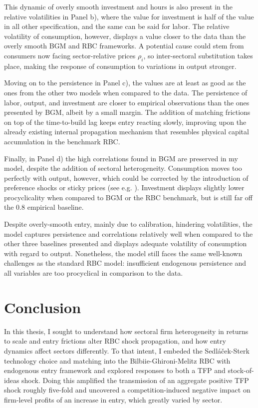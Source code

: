 \documentclass[a4paper,12pt]{article} %
\numberwithin{equation}{section} %
\numberwithin{figure}{section}
\numberwithin{table}{section}
\begin{document}
This dynamic of overly smooth investment and hours is also present in the relative volatilities in Panel b), where the value 
for investment is half of the value in all other specification, and the same can be said for labor. The relative volatility of
consumption, however, displays a value closer to the data than the overly smooth BGM and RBC frameworks. A potential cause could 
stem from consumers now facing sector-relative prices $\rho_i$, so inter-sectoral substitution takes place, making the 
response of consumption to variations in output stronger.

Moving on to the persistence in Panel c), the values are at least as good as the ones from the other two models 
when compared to the data. The persistence of labor, output, and investment are closer to 
empirical observations than the ones presented by BGM, albeit by a small margin. The addition of matching frictions on top of the 
time-to-build lag keeps entry reacting slowly, improving upon the already existing internal propagation mechanism 
that resembles physical capital accumulation in the benchmark RBC.

Finally, in Panel d) the high correlations found in BGM are preserved in my model, despite the addition of sectoral heterogeneity.
Consumption moves too perfectly with output, however, which could be corrected by the introduction of preference shocks or sticky
prices (see e.g. \cite{smets2007shocks}). Investment displays slightly lower procyclicality when compared to BGM or the RBC benchmark, but is still far off the $0.8$ 
empirical baseline. 

Despite overly-smooth entry, mainly due to calibration, hindering volatilities, the model captures persistence and 
correlations relatively well when compared to the other three baselines presented and displays adequate volatility of consumption
with regard to output. Nonetheless, the model still faces the same well-known challenges as the standard RBC model: 
insufficient endogenous persistence and all variables are too procyclical in  comparison to the data.


\section{Conclusion}
\label{sec:conclusion}

In this thesis, I sought to understand how sectoral firm heterogeneity in returns to scale and entry frictions alter RBC shock propagation, and how
entry dynamics affect sectors differently.
To that intent, I embeded the Sedláček-Sterk technology choice and matching into the Bilbiie-Ghironi-Melitz RBC with endogenous entry framework and explored
responses to both a TFP and stock-of-ideas shock.
Doing this amplified the transmission of an aggregate positive TFP shock roughly five-fold and uncovered a competition-induced negative 
impact on firm-level profits of an increase in entry, which greatly varied by sector. 
\end{document}
